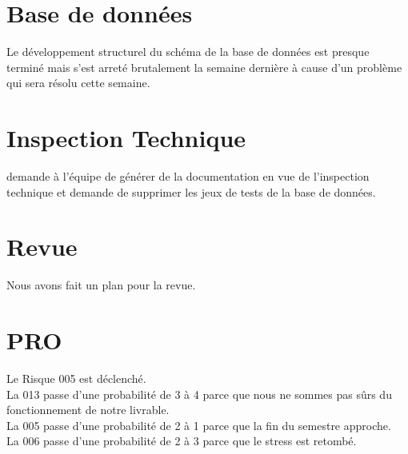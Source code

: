 \documentclass [a4paper] {article}
\begin{document}
\section{Base de données}
Le développement structurel du schéma de la base de données est presque terminé mais s'est arreté brutalement la semaine dernière à cause d'un problème qui sera résolu cette semaine.

\section{Inspection Technique}
\Michel{} demande à l'équipe de générer de la documentation en vue de l'inspection technique et demande de supprimer les jeux de tests de la base de données.

\section{Revue}
Nous avons fait un plan pour la revue.

\section{PRO}
Le Risque 005 est déclenché. \\
La \FDR{} 013 passe d'une probabilité de 3 à 4 parce que nous ne sommes pas sûrs du fonctionnement de notre livrable. \\
La \FDO{} 005 passe d'une probabilité de 2 à 1 parce que la fin du semestre approche. \\
La \FDO{} 006 passe d'une probabilité de 2 à 3 parce que le stress est retombé.


\end{document}

